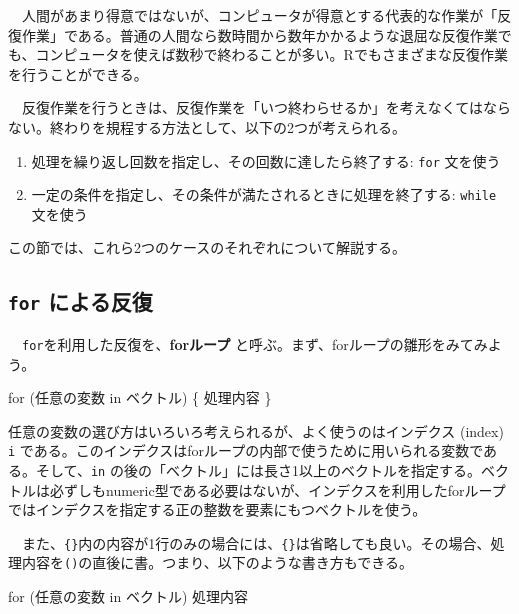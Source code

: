 \documentclass[
  a4paper,
  pandoc,
  ja=standard,
  jafont=haranoaji]{bxjsbook}
\newenvironment{Shaded}{\begin{snugshade}}{\end{snugshade}}
\newcommand{\ControlFlowTok}[1]{\textcolor[rgb]{0.00,0.48,0.65}{#1}}
\newcommand{\NormalTok}[1]{\textcolor[rgb]{0.00,0.48,0.65}{#1}}
\providecommand{\tightlist}{%
  \setlength{\itemsep}{0pt}\setlength{\parskip}{0pt}}
\begin{document}
　人間があまり得意ではないが、コンピュータが得意とする代表的な作業が「反復作業」である。普通の人間なら数時間から数年かかるような退屈な反復作業でも、コンピュータを使えば数秒で終わることが多い。Rでもさまざまな反復作業を行うことができる。

　反復作業を行うときは、反復作業を「いつ終わらせるか」を考えなくてはならない。終わりを規程する方法として、以下の2つが考えられる。

\begin{enumerate}
\def\labelenumi{\arabic{enumi}.}
\tightlist
\item
  処理を繰り返し回数を指定し、その回数に達したら終了する: \texttt{for}
  文を使う
\item
  一定の条件を指定し、その条件が満たされるときに処理を終了する:
  \texttt{while} 文を使う
\end{enumerate}

この節では、これら2つのケースのそれぞれについて解説する。

\hypertarget{for-ux306bux3088ux308bux53cdux5fa9}{%
\subsection{\texorpdfstring{\texttt{for}
による反復}{for による反復}}\label{for-ux306bux3088ux308bux53cdux5fa9}}

　\texttt{for}を利用した反復を、\textbf{forループ}
と呼ぶ。まず、forループの雛形をみてみよう。

\begin{Shaded}
\begin{Highlighting}[]
\ControlFlowTok{for}\NormalTok{ (任意の変数 }\ControlFlowTok{in}\NormalTok{ ベクトル) \{}
\NormalTok{  処理内容}
\NormalTok{\}}
\end{Highlighting}
\end{Shaded}

任意の変数の選び方はいろいろ考えられるが、よく使うのはインデクス (index)
\texttt{i}
である。このインデクスはforループの内部で使うために用いられる変数である。そして、\texttt{in}
の後の「ベクトル」には長さ1以上のベクトルを指定する。ベクトルは必ずしもnumeric型である必要はないが、インデクスを利用したforループではインデクスを指定する正の整数を要素にもつベクトルを使う。

　また、\texttt{\{\}}内の内容が1行のみの場合には、\texttt{\{\}}は省略しても良い。その場合、処理内容を\texttt{()}の直後に書。つまり、以下のような書き方もできる。

\begin{Shaded}
\begin{Highlighting}[]
\ControlFlowTok{for}\NormalTok{ (任意の変数 }\ControlFlowTok{in}\NormalTok{ ベクトル) 処理内容}
\end{Highlighting}
\end{Shaded}
\end{document}
